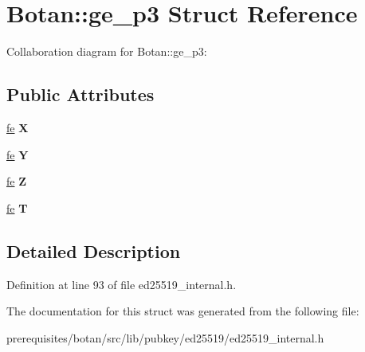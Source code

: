 \hypertarget{struct_botan_1_1ge__p3}{}\section{Botan\+:\+:ge\+\_\+p3 Struct Reference}
\label{struct_botan_1_1ge__p3}


Collaboration diagram for Botan\+:\+:ge\+\_\+p3\+:
\subsection*{Public Attributes}
\begin{DoxyCompactItemize}
\item 
\mbox{\label{struct_botan_1_1ge__p3_ae36d18e326dd068b93a23da48f7071b8}} 
\mbox{\hyperlink{class_botan_1_1_f_e__25519}{fe}} {\bfseries X}
\item 
\mbox{\label{struct_botan_1_1ge__p3_a9cba1a83fb2a3ea272b5c0bbcfc8babe}} 
\mbox{\hyperlink{class_botan_1_1_f_e__25519}{fe}} {\bfseries Y}
\item 
\mbox{\label{struct_botan_1_1ge__p3_a29816835eeb8735bbf8fc8aacb61f905}} 
\mbox{\hyperlink{class_botan_1_1_f_e__25519}{fe}} {\bfseries Z}
\item 
\mbox{\label{struct_botan_1_1ge__p3_ac4f74a0309550adb4ae8978035889e22}} 
\mbox{\hyperlink{class_botan_1_1_f_e__25519}{fe}} {\bfseries T}
\end{DoxyCompactItemize}


\subsection{Detailed Description}


Definition at line 93 of file ed25519\+\_\+internal.\+h.



The documentation for this struct was generated from the following file\+:\begin{DoxyCompactItemize}
\item 
prerequisites/botan/src/lib/pubkey/ed25519/ed25519\+\_\+internal.\+h\end{DoxyCompactItemize}
